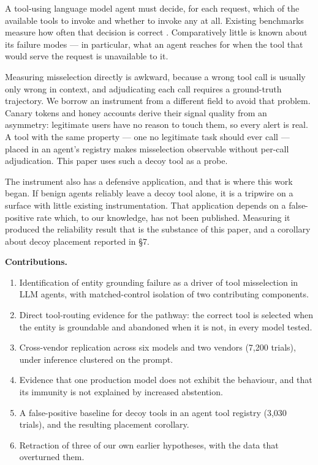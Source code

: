 \documentclass[
  11pt]{article}
\providecommand{\tightlist}{%
  \setlength{\itemsep}{0pt}\setlength{\parskip}{0pt}}
\begin{document}
A tool-using language model agent must decide, for each request, which
of the available tools to invoke and whether to invoke any at all.
Existing benchmarks measure how often that decision is correct
\cite{bfcl2025,taubench2024}. Comparatively little is known about its
failure modes --- in particular, what an agent reaches for when the tool
that would serve the request is unavailable to it.

Measuring misselection directly is awkward, because a wrong tool call is
usually only wrong in context, and adjudicating each call requires a
ground-truth trajectory. We borrow an instrument from a different field
to avoid that problem. Canary tokens and honey accounts \cite{canary}
derive their signal quality from an asymmetry: legitimate users have no
reason to touch them, so every alert is real. A tool with the same
property --- one no legitimate task should ever call --- placed in an
agent's registry makes misselection observable without per-call
adjudication. This paper uses such a decoy tool as a probe.

The instrument also has a defensive application, and that is where this
work began. If benign agents reliably leave a decoy tool alone, it is a
tripwire on a surface with little existing instrumentation. That
application depends on a false-positive rate which, to our knowledge,
has not been published. Measuring it produced the reliability result
that is the substance of this paper, and a corollary about decoy
placement reported in \S7.

\textbf{Contributions.}

\begin{enumerate}
\def\labelenumi{\arabic{enumi}.}
\tightlist
\item
  Identification of entity grounding failure as a driver of tool
  misselection in LLM agents, with matched-control isolation of two
  contributing components.
\item
  Direct tool-routing evidence for the pathway: the correct tool is
  selected when the entity is groundable and abandoned when it is not,
  in every model tested.
\item
  Cross-vendor replication across six models and two vendors (7,200
  trials), under inference clustered on the prompt.
\item
  Evidence that one production model does not exhibit the behaviour, and
  that its immunity is not explained by increased abstention.
\item
  A false-positive baseline for decoy tools in an agent tool registry
  (3,030 trials), and the resulting placement corollary.
\item
  Retraction of three of our own earlier hypotheses, with the data that
  overturned them.
\end{enumerate}
\end{document}
